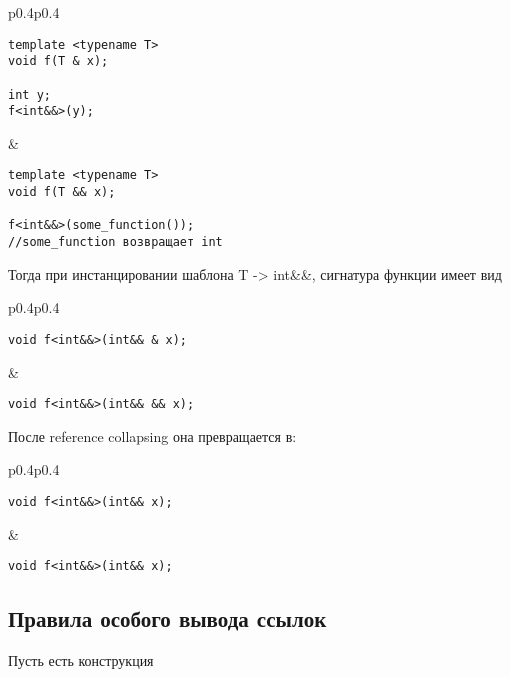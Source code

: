 \begin{center}

\begin{tabular}{p{0.4\linewidth}p{0.4\linewidth}}
\begin{verbatim}
template <typename T>
void f(T & x);

int y;
f<int&&>(y);
\end{verbatim}
&
\begin{verbatim}
template <typename T>
void f(T && x);

f<int&&>(some_function());
//some_function возвращает int
\end{verbatim}
\end{tabular}

Тогда при инстанцировании шаблона T -> int\&\&, сигнатура функции имеет вид

\begin{tabular}{p{0.4\linewidth}p{0.4\linewidth}}
\begin{verbatim}
void f<int&&>(int&& & x);
\end{verbatim}
&
\begin{verbatim}
void f<int&&>(int&& && x);
\end{verbatim}
\end{tabular}

После reference collapsing она превращается в:

\begin{tabular}{p{0.4\linewidth}p{0.4\linewidth}}
\begin{verbatim}
void f<int&&>(int&& x);
\end{verbatim}
&
\begin{verbatim}
void f<int&&>(int&& x);
\end{verbatim}
\end{tabular}
\end{center}

\subsection{Правила особого вывода ссылок}

	Пусть есть конструкция

